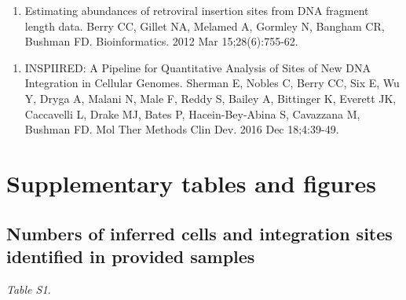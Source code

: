 \documentclass[12pt,]{article}
\providecommand{\tightlist}{%
  \setlength{\itemsep}{0pt}\setlength{\parskip}{0pt}}
\begin{document}
\vspace{0.1cm}

\begin{enumerate}
\def\labelenumi{\arabic{enumi}.}
\setcounter{enumi}{2}
\tightlist
\item
  Estimating abundances of retroviral insertion sites from DNA fragment
  length data. Berry CC, Gillet NA, Melamed A, Gormley N, Bangham CR,
  Bushman FD. Bioinformatics. 2012 Mar 15;28(6):755-62.
\end{enumerate}

\vspace{0.1cm}

\begin{enumerate}
\def\labelenumi{\arabic{enumi}.}
\setcounter{enumi}{3}
\tightlist
\item
  INSPIIRED: A Pipeline for Quantitative Analysis of Sites of New DNA
  Integration in Cellular Genomes. Sherman E, Nobles C, Berry CC, Six E,
  Wu Y, Dryga A, Malani N, Male F, Reddy S, Bailey A, Bittinger K,
  Everett JK, Caccavelli L, Drake MJ, Bates P, Hacein-Bey-Abina S,
  Cavazzana M, Bushman FD. Mol Ther Methods Clin Dev. 2016 Dec
  18;4:39-49.
\end{enumerate}

\newpage

\section{Supplementary tables and
figures}\label{supplementary-tables-and-figures}

\subsection{Numbers of inferred cells and integration sites identified
in provided
samples}\label{numbers-of-inferred-cells-and-integration-sites-identified-in-provided-samples}

\emph{Table S1.}\\
\end{document}
